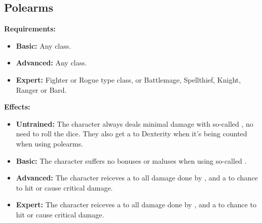 \documentclass[openany,10pt,a4paper]{book}
\begin{document}
\subsection{Polearms}
\begin{table}[!ht]
\centering
{}
\end{table}
\textbf{Requirements:}
\begin{itemize}
	\item \textbf{Basic:} Any class.
	\item \textbf{Advanced:} Any class.
	\item \textbf{Expert:} Fighter or Rogue type class, or Battlemage, Spellthief, Knight, Ranger or Bard.
\end{itemize}
\textbf{Effects:}
\begin{itemize}
	\item \textbf{Untrained:} The character always deals minimal damage with so-called  , no need to roll the dice. They also get a  to Dexterity when it's being counted when using polearms.
	\item \textbf{Basic:} The character suffers no bonuses or maluses when using so-called  .
	\item \textbf{Advanced:} The character reiceves a  to all damage done by  , and a  to chance to hit or cause critical damage.
	\item \textbf{Expert:} The character reiceves a  to all damage done by  , and a  to chance to hit or cause critical damage.
\end{itemize}\newpage
\end{document}
